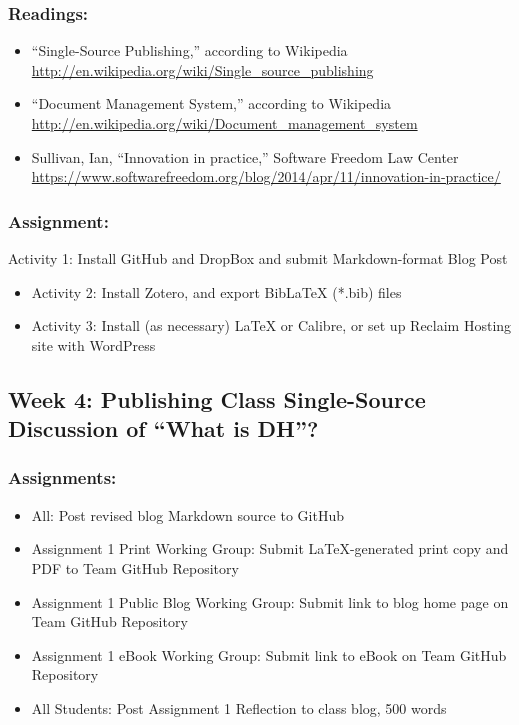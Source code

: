 \documentclass[]{article}
\begin{document}
\subsubsection{Readings:}\label{readings-2}

\begin{itemize}
\itemsep1pt\parskip0pt
\item
  ``Single-Source Publishing,'' according to Wikipedia
  \url{http://en.wikipedia.org/wiki/Single_source_publishing}
\item
  ``Document Management System,'' according to Wikipedia
  \url{http://en.wikipedia.org/wiki/Document_management_system}
\item
  Sullivan, Ian, ``Innovation in practice,'' Software Freedom Law Center
  \url{https://www.softwarefreedom.org/blog/2014/apr/11/innovation-in-practice/}
\end{itemize}

\subsubsection{Assignment:}\label{assignment-2}

Activity 1: Install GitHub and DropBox and submit Markdown-format Blog
Post

\begin{itemize}
\item
  Activity 2: Install Zotero, and export BibLaTeX (*.bib) files
\item
  Activity 3: Install (as necessary) LaTeX or Calibre, or set up Reclaim
  Hosting site with WordPress
\end{itemize}

\subsection{Week 4: Publishing Class Single-Source Discussion of ``What
is
DH''?}\label{week-4-publishing-class-single-source-discussion-of-what-is-dh}

\subsubsection{Assignments:}\label{assignments}

\begin{itemize}
\itemsep1pt\parskip0pt
\item
  All: Post revised blog Markdown source to GitHub
\item
  Assignment 1 Print Working Group: Submit LaTeX-generated print copy
  and PDF to Team GitHub Repository
\item
  Assignment 1 Public Blog Working Group: Submit link to blog home page
  on Team GitHub Repository
\item
  Assignment 1 eBook Working Group: Submit link to eBook on Team GitHub
  Repository
\item
  All Students: Post Assignment 1 Reflection to class blog, 500 words
\end{itemize}
\end{document}
